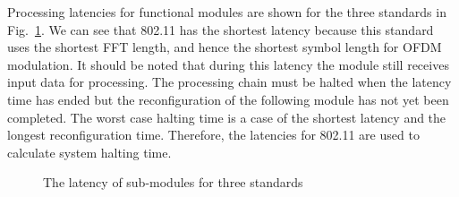 Processing latencies for functional modules are shown for the three standards in Fig.~\ref{fig:Latency}. We can see that 802.11 has the shortest latency because this standard uses the shortest FFT length, and hence the shortest symbol length for OFDM modulation.
It should be noted that during this latency the module still receives input data for processing.
The processing chain must be halted when the latency time has ended but the reconfiguration of the following module has not yet been completed.
The worst case halting time is a case of the shortest latency and the longest reconfiguration time.
Therefore, the latencies for 802.11 are used to calculate system halting time.
\begin{figure}
\centering
{}
\caption{The latency of sub-modules for three standards}
\label{fig:Latency}
\end{figure}

